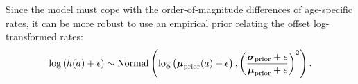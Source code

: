 Since the model must cope with the order-of-magnitude differences of age-specific rates, it can be more robust to use an empirical prior relating the offset log-transformed rates:
\[
\log\left(h(a)+\epsilon\right) \sim \operatorname{Normal}\left(\log\left(\boldsymbol{\mu}_{\text{prior}}(a)+\epsilon\right),
\left(\frac{\boldsymbol{\sigma}_{\text{prior}}+\epsilon}{\boldsymbol{\mu}_{\text{prior}}+\epsilon}\right)^2\right).
\]
